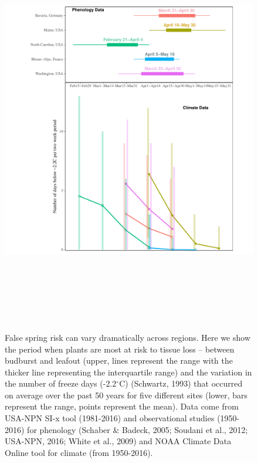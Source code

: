 \documentclass{article}\usepackage[]{graphicx}\usepackage[]{color}
\begin{document}
\begin{figure} [H] 
 \begin{center}
 \includegraphics[width=16cm, height=18cm]{..//figure/RegRisk_flipped.pdf} 
 \caption{False spring risk can vary dramatically across regions. Here we show the period when plants are most at risk to tissue loss -- between budburst and leafout (upper, lines represent the range with the thicker line representing the interquartile range) and the variation in the number of freeze days (-2.2$^{\circ}$C) (Schwartz, 1993) that occurred on average over the past 50 years for five different sites (lower, bars represent the range, points represent the mean). Data come from USA-NPN SI-x tool (1981-2016) and observational studies (1950-2016) for phenology (Schaber \& Badeck, 2005; Soudani et al., 2012; USA-NPN, 2016; White et al., 2009) and NOAA Climate Data Online tool for climate (from 1950-2016). } \label{fig:region}  
 \end{center}
 \end{figure}
\end{document}

